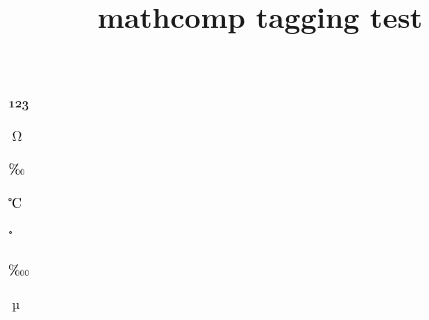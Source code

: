 \documentclass{article}
\title{mathcomp tagging test}
\begin{document}
$\tcdigitoldstyle{123}$

$\tcohm$

$\tcperthousand$

$\tccelsius$

$\tcdegree$

$\tcpertenthousand$

$\tcmu$
\end{document}
